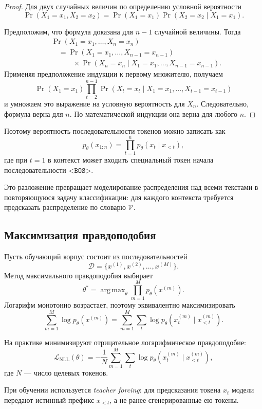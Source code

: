 \documentclass[12pt,a4paper]{article}
\DeclareMathOperator{\argmax}{arg\,max}
\newcommand{\V}{\mathcal{V}}
\newcommand{\D}{\mathcal{D}}
\newcommand{\1}{\mathbf{1}}
\theoremstyle{definition}
\theoremstyle{remark}
\begin{document}
\begin{proof}
Для двух случайных величин по определению условной вероятности
\[
\Pr(X_1=x_1,X_2=x_2)
=
\Pr(X_1=x_1)
\Pr(X_2=x_2\mid X_1=x_1).
\]

Предположим, что формула доказана для $n-1$ случайной величины. Тогда
\begin{align*}
&\Pr(X_1=x_1,\ldots,X_n=x_n)
\\
&\quad =
\Pr(X_1=x_1,\ldots,X_{n-1}=x_{n-1})
\\
&\qquad\quad{}\times
\Pr(X_n=x_n\mid X_1=x_1,\ldots,X_{n-1}=x_{n-1}).
\end{align*}
Применяя предположение индукции к первому множителю, получаем
\[
\Pr(X_1=x_1)
\prod_{t=2}^{n-1}
\Pr(X_t=x_t\mid X_1=x_1,\ldots,X_{t-1}=x_{t-1})
\]
и умножаем это выражение на условную вероятность для $X_n$.
Следовательно, формула верна для $n$. По математической индукции она
верна для любого $n$.
\end{proof}

Поэтому вероятность последовательности токенов можно записать как
\[
p_\theta(x_{1:n})
=
\prod_{t=1}^{n}p_\theta(x_t\mid x_{<t}),
\]
где при $t=1$ в контекст может входить специальный токен начала
последовательности $\texttt{<BOS>}$.

Это разложение превращает моделирование распределения над всеми текстами в
повторяющуюся задачу классификации: для каждого контекста требуется
предсказать распределение по словарю $\V$.

\subsection{Максимизация правдоподобия}

Пусть обучающий корпус состоит из последовательностей
\[
\D=\{x^{(1)},x^{(2)},\ldots,x^{(M)}\}.
\]
Метод максимального правдоподобия выбирает
\[
\theta^\ast
=
\argmax_\theta
\prod_{m=1}^{M}p_\theta(x^{(m)}).
\]
Логарифм монотонно возрастает, поэтому эквивалентно максимизировать
\[
\sum_{m=1}^{M}\log p_\theta(x^{(m)})
=
\sum_{m=1}^{M}\sum_{t}
\log p_\theta\!\left(x_t^{(m)}\mid x_{<t}^{(m)}\right).
\]

На практике минимизируют отрицательное логарифмическое правдоподобие:
\[
\mathcal{L}_{\mathrm{NLL}}(\theta)
=
-\frac{1}{N}
\sum_{m=1}^{M}\sum_t
\log p_\theta\!\left(x_t^{(m)}\mid x_{<t}^{(m)}\right),
\]
где $N$ --- число целевых токенов.

При обучении используется \emph{teacher forcing}: для предсказания токена
$x_t$ модели передают истинный префикс $x_{<t}$, а не ранее сгенерированные
ею токены.
\end{document}
